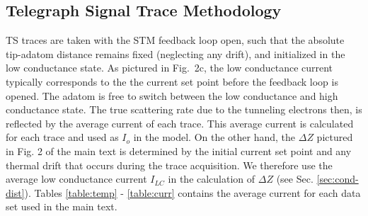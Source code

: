 \documentclass[reprint,amsmath,amssymb,aps,nofootinbib,onecolumn]{revtex4-2}
\begin{document}
\subsection{Telegraph Signal Trace Methodology}
TS traces are taken with the STM feedback loop open, such that the absolute tip-adatom distance remains fixed (neglecting any drift), and initialized in the low conductance state. As pictured in Fig.~2c, the low conductance current typically corresponds to the the current set point before the feedback loop is opened. The adatom is free to switch between the low conductance and high conductance state. The true scattering rate due to the tunneling electrons then, is reflected by the average current of each trace. This average current is calculated for each trace and used as $I_o$ in the model. On the other hand, the $\Delta Z$ pictured in Fig. 2 of the main text is determined by the initial current set point and any thermal drift that occurs during the trace acquisition. We therefore use the average low conductance current $I_{LC}$ in the calculation of $\Delta Z$ (see Sec. \ref{sec:cond-dist}). Tables \ref{table:temp} - \ref{table:curr} contains the average current for each data set used in the main text.  
\end{document}

